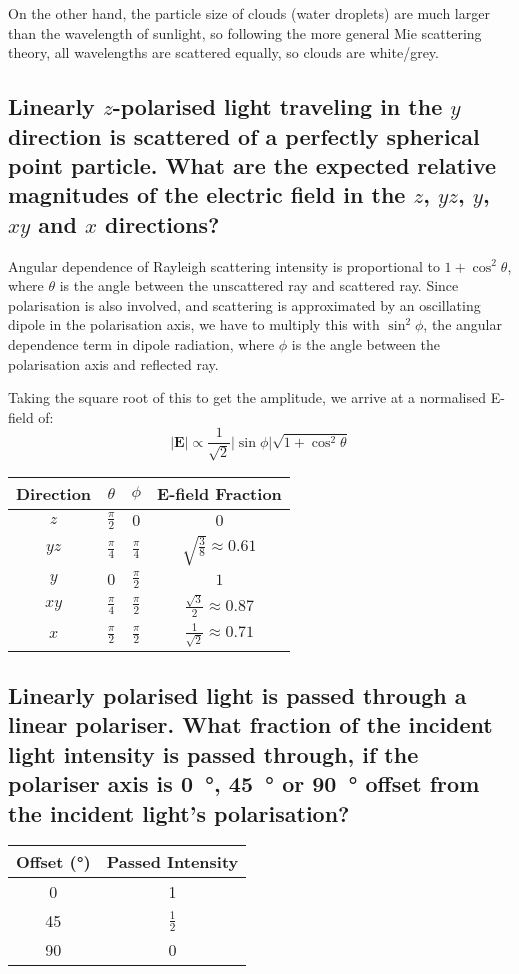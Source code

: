 \documentclass[a4paper]{scrartcl}
\begin{document}
On the other hand, the particle size of clouds (water droplets) are much larger than the wavelength of sunlight, so following the more general Mie scattering theory, all wavelengths are scattered equally, so clouds are white/grey.

\subsection{Linearly \(z\)-polarised light traveling in the \(y\) direction is scattered of a perfectly spherical point particle. What are the expected relative magnitudes of the electric field in the \(z\), \(y z\), \(y\), \(x y\) and \(x\) directions?}
Angular dependence of Rayleigh scattering intensity is proportional to \(1 + \cos^2 \theta\), where \(\theta\) is the angle between the unscattered ray and scattered ray. Since polarisation is also involved, and scattering is approximated by an oscillating dipole in the polarisation axis, we have to multiply this with \(\sin^2 \phi\), the angular dependence term in dipole radiation, where \(\phi\) is the angle between the polarisation axis and reflected ray.

Taking the square root of this to get the amplitude, we arrive at a normalised E-field of:
\[|\mathbf{E}| \propto \frac{1}{\sqrt{2}} |\sin \phi| \sqrt{1 + \cos^2 \theta}\]

\begin{center}
    \begin{tabular}{c | c | c | c}
        Direction & \(\theta\) & \(\phi\) & E-field Fraction \\
        \hline
        \(z\) & \(\frac{\pi}{2}\) & \(0\) & \(0\) \\
        \(y z\) & \(\frac{\pi}{4}\) & \(\frac{\pi}{4}\) & \(\sqrt{\frac{3}{8}} \approx 0.61\) \\
        \(y\) & \(0\) & \(\frac{\pi}{2}\) & \(1\) \\
        \(x y\) & \(\frac{\pi}{4}\) & \(\frac{\pi}{2}\) & \(\frac{\sqrt{3}}{2}  \approx 0.87\) \\
        \(x\) & \(\frac{\pi}{2}\) & \(\frac{\pi}{2}\) & \(\frac{1}{\sqrt{2}} \approx 0.71\)
    \end{tabular}
\end{center}

\subsection{Linearly polarised light is passed through a linear polariser. What fraction of the incident light intensity is passed through, if the polariser axis is \SI{0}{\degree}, \SI{45}{\degree} or \SI{90}{\degree} offset from the incident light's polarisation?}
\begin{center}
    \begin{tabular}{c | c}
    Offset (\si{\degree}) & Passed Intensity \\
    \hline
    0 & 1 \\
    45 & \(\frac{1}{2}\) \\
    90 & 0
    \end{tabular}
\end{center}
\end{document}
